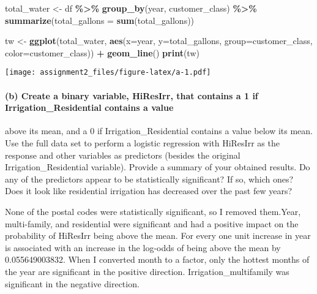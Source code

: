 \documentclass[]{article}
\newenvironment{Shaded}{\begin{snugshade}}{\end{snugshade}}
\newcommand{\DataTypeTok}[1]{\textcolor[rgb]{0.13,0.29,0.53}{#1}}
\newcommand{\KeywordTok}[1]{\textcolor[rgb]{0.13,0.29,0.53}{\textbf{#1}}}
\newcommand{\NormalTok}[1]{#1}
\newcommand{\OperatorTok}[1]{\textcolor[rgb]{0.81,0.36,0.00}{\textbf{#1}}}
\newcommand{\StringTok}[1]{\textcolor[rgb]{0.31,0.60,0.02}{#1}}
\let\oldparagraph\paragraph
\renewcommand{\paragraph}[1]{\oldparagraph{#1}\mbox{}}
\begin{document}
\begin{Shaded}
\begin{Highlighting}[]
\NormalTok{total\_water <{-}}\StringTok{ }\NormalTok{df }\OperatorTok{\%>\%}\StringTok{ }\KeywordTok{group\_by}\NormalTok{(year, customer\_class) }\OperatorTok{\%>\%}\StringTok{ }
\StringTok{                }\KeywordTok{summarize}\NormalTok{(}\DataTypeTok{total\_gallons =} \KeywordTok{sum}\NormalTok{(total\_gallons))}

\NormalTok{tw <{-}}\StringTok{ }\KeywordTok{ggplot}\NormalTok{(total\_water, }\KeywordTok{aes}\NormalTok{(}\DataTypeTok{x=}\NormalTok{year, }\DataTypeTok{y=}\NormalTok{total\_gallons, }\DataTypeTok{group=}\NormalTok{customer\_class, }\DataTypeTok{color=}\NormalTok{customer\_class)) }\OperatorTok{+}
\StringTok{        }\KeywordTok{geom\_line}\NormalTok{()}
\KeywordTok{print}\NormalTok{(tw)}
\end{Highlighting}
\end{Shaded}

\texttt{[image: assignment2\_files/figure-latex/a-1.pdf]}

\hypertarget{b-create-a-binary-variable-hiresirr-that-contains-a-1-if-irrigation_residential-contains-a-value}{%
\paragraph{(b) Create a binary variable, HiResIrr, that contains a 1 if
Irrigation\_Residential contains a
value}\label{b-create-a-binary-variable-hiresirr-that-contains-a-1-if-irrigation_residential-contains-a-value}}

above its mean, and a 0 if Irrigation\_Residential contains a value
below its mean. Use the full data set to perform a logistic regression
with HiResIrr as the response and other variables as predictors (besides
the original Irrigation\_Residential variable). Provide a summary of
your obtained results. Do any of the predictors appear to be
statistically significant? If so, which ones? Does it look like
residential irrigation has decreased over the past few years?

None of the postal codes were statistically significant, so I removed
them.Year, multi-family, and residential were significant and had a
positive impact on the probability of HiResIrr being above the mean. For
every one unit increase in year is associated with an increase in the
log-odds of being above the mean by 0.055649003832. When I converted
month to a factor, only the hottest months of the year are significant
in the positive direction. Irrigation\_multifamily was significant in
the negative direction.
\end{document}
